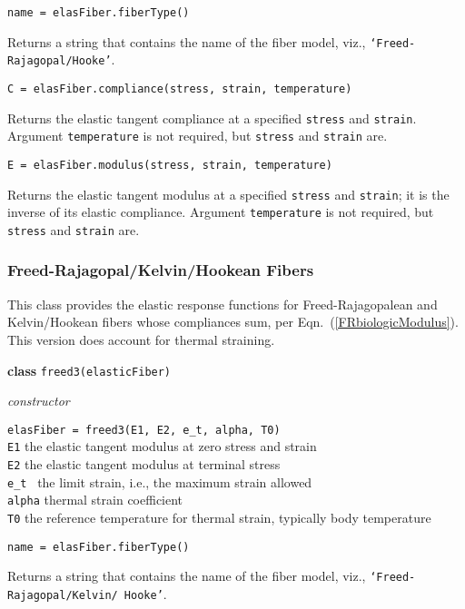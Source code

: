 \bigskip\noindent
\texttt{name = elasFiber.fiberType()}

\medskip\noindent
Returns a string that contains the name of the fiber model, viz., \texttt{`Freed-Rajagopal/Hooke'}.

\medskip\noindent
\texttt{C = elasFiber.compliance(stress, strain, temperature)}

\medskip\noindent
Returns the elastic tangent compliance at a specified \texttt{stress} and \texttt{strain}.    Argument \texttt{temperature} is not required, but \texttt{stress} and \texttt{strain} are.

\medskip\noindent
\texttt{E = elasFiber.modulus(stress, strain, temperature)}

\medskip\noindent
Returns the elastic tangent modulus at a specified \texttt{stress} and \texttt{strain}; it is the inverse of its elastic compliance.  Argument \texttt{temperature} is not required, but \texttt{stress} and \texttt{strain} are.


\subsubsection{Freed-Rajagopal\slash Kelvin\slash Hookean Fibers}

This class provides the elastic response functions for Freed-Rajagopalean and Kelvin\slash Hookean fibers whose compliances sum, per Eqn.~(\ref{FRbiologicModulus}).  This version does account for thermal straining.

\bigskip\noindent
\textbf{class} \texttt{freed3(elasticFiber)}

\medskip\noindent
\textit{constructor}

\medskip\noindent
\texttt{elasFiber = freed3(E1, E2, e\_t, alpha, T0)} \\
\indent \texttt{E1} \quad\;\;\: the elastic tangent modulus at zero stress and strain \\
\indent \texttt{E2} \quad\;\;\: the elastic tangent modulus at terminal stress \\
\indent \texttt{e\_t} \quad\;\, the limit strain, i.e., the maximum strain allowed \\
\indent \texttt{alpha} \; thermal strain coefficient \\
\indent \texttt{T0} \quad\;\;\; the reference temperature for thermal strain, typically body temperature

\bigskip\noindent
\texttt{name = elasFiber.fiberType()}

\medskip\noindent
Returns a string that contains the name of the fiber model, viz., \texttt{`Freed-Rajagopal/Kelvin/ Hooke'}.

